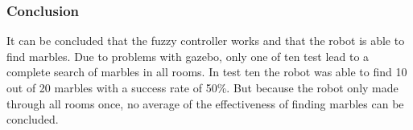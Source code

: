 \documentclass[../Head/Main.tex]{subfiles}
\begin{document}





\subsubsection{Conclusion}

It can be concluded that the fuzzy controller works and that the robot is able to find marbles. Due to problems with gazebo, only one of ten test lead to a complete search of marbles in all rooms. In test ten the robot was able to find 10 out of 20 marbles with a success rate of 50\%. But because the robot only made through all rooms once, no average of the effectiveness of finding marbles can be concluded.     
\end{document}
